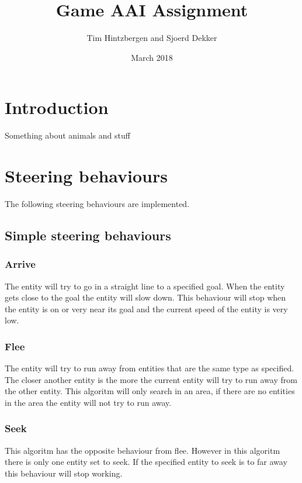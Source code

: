 \documentclass[10pt]{article}
\title{Game AAI Assignment}
\author{Tim Hintzbergen and Sjoerd Dekker}
\date{March 2018}
\begin{document}
   \maketitle
   \thispagestyle{empty}
   \newpage
   \newpage
	\setcounter{page}{1}
   \section {Introduction}
   Something about animals and stuff
   \newpage

   \tableofcontents{}
   \newpage
   \section{Steering behaviours}
   The following steering behaviours are implemented. 
   \subsection{Simple steering behaviours}
   \subsubsection {Arrive}
   The entity will try to go in a straight line to a specified goal. When the entity gets close to the goal the entity will slow down. This behaviour will stop when the entity is on or very near its goal and the current speed of the entity is very low. 
   \subsubsection {Flee}
   The entity will try to run away from entities that are the same type as specified. The closer another entity is the more the current entity will try to run away from the other entity. This algoritm will only search in an area, if there are no entities in the area the entity will not try to run away.
   \subsubsection {Seek}
   This algoritm has the opposite behaviour from flee. However in this algoritm there is only one entity set to seek. If the specified entity to seek is to far away this behaviour will stop working.
\end{document}

